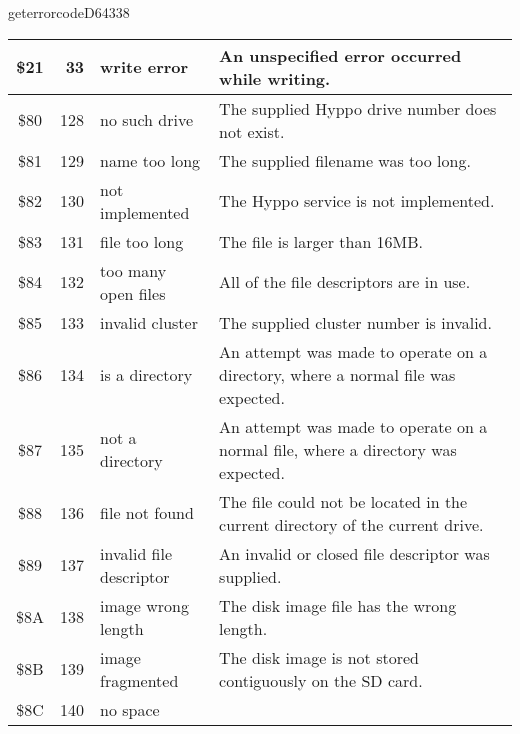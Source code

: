 \begin{hyppotrap}{geterrorcode}{D643}{38}
{\begin{longtable}{|c|r|l|p{8cm}|}
    \\\hline
    \index{Hyppo Error Codes!\$21}
    \$21 & 33 & write error &
    An unspecified error occurred while writing.
    \\\hline
    \index{Hyppo Error Codes!\$80}
    \$80 & 128 & no such drive &
    The supplied Hyppo drive number does not exist.
    \\\hline
    \index{Hyppo Error Codes!\$81}
    \$81 & 129 & {name too long} &
    The supplied filename was too long.
    \\\hline
    \index{Hyppo Error Codes!\$82}
    \$82 & 130 & not implemented &
    The Hyppo service is not implemented.
    \\\hline
    \index{Hyppo Error Codes!\$83}
    \$83 & 131 & file too long &
    The file is larger than 16MB.
    \\\hline
    \index{Hyppo Error Codes!\$84}
    \$84 & 132 & \makecell[tl]{too many\\open files} &
    All of the file descriptors are in use.
    \\\hline
    \index{Hyppo Error Codes!\$85}
    \$85 & 133 & invalid cluster &
    The supplied cluster number is invalid.
    \\\hline
    \index{Hyppo Error Codes!\$86}
    \$86 & 134 & is a directory &
    An attempt was made to operate on a directory, where a normal file was
    expected.
    \\\hline
    \index{Hyppo Error Codes!\$87}
    \$87 & 135 & not a directory &
    An attempt was made to operate on a normal file, where a directory was
    expected.
    \\\hline
    \index{Hyppo Error Codes!\$88}
    \$88 & 136 & file not found &
    The file could not be located in the current directory of the current drive.
    \\\hline
    \index{Hyppo Error Codes!\$89}
    \$89 & 137 & \makecell[tl]{invalid file\\descriptor} &
    An invalid or closed file descriptor was supplied.
    \\\hline
    \index{Hyppo Error Codes!\$8A}
    \$8A & 138 & \makecell[tl]{image wrong\\length} &
    The disk image file has the wrong length.
    \\\hline
    \index{Hyppo Error Codes!\$8B}
    \$8B & 139 & image fragmented &
    The disk image is not stored contiguously on the SD card.
    \\\hline
    \index{Hyppo Error Codes!\$8C}
    \$8C & 140 & no space &

\end{longtable}}
\end{hyppotrap}
